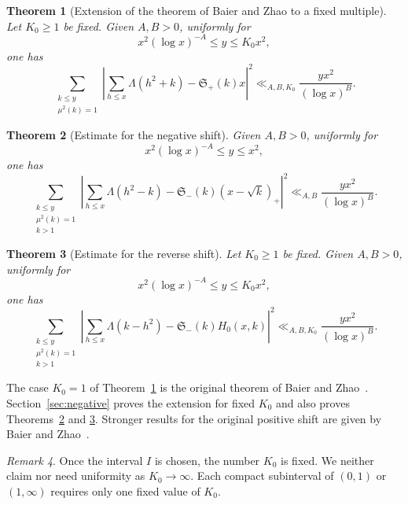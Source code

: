 \documentclass[12pt,reqno]{amsart}
\numberwithin{equation}{section}
\theoremstyle{plain}
\newtheorem{theorem}{Theorem}[section]
\theoremstyle{remark}
\newtheorem{remark}[theorem]{Remark}
\begin{document}
\begin{theorem}[Extension of the theorem of Baier and Zhao to a fixed multiple]
\label{thm:positive-main}
Let $K_0\geq1$ be fixed.  Given $A,B>0$, uniformly for
\[
 x^2(\log x)^{-A}\leq y\leq K_0x^2,
\]
one has
\begin{equation*}\label{positive-mean-square}
 \sum_{\substack{k\leq y\\ \mu^2(k)=1}}
 \left|
   \sum_{h\leq x}\Lambda(h^2+k)-\mathfrak S_+(k)x
 \right|^2
 \ll_{A,B,K_0}\frac{yx^2}{(\log x)^B}.
\end{equation*}
\end{theorem}

\begin{theorem}[Estimate for the negative shift]\label{thm:negative-main}
Given $A,B>0$, uniformly for
\[
 x^2(\log x)^{-A}\leq y\leq x^2,
\]
one has
\begin{equation*}\label{negative-mean-square}
 \sum_{\substack{k\leq y\\ \mu^2(k)=1\\k>1}}
 \left|
   \sum_{h\leq x}\Lambda(h^2-k)
   -\mathfrak S_-(k)(x-\sqrt{k})_+
 \right|^2
 \ll_{A,B}\frac{yx^2}{(\log x)^B}.
\end{equation*}
\end{theorem}

\begin{theorem}[Estimate for the reverse shift]\label{thm:reverse-main}
Let $K_0\geq1$ be fixed.
Given $A,B>0$, uniformly for
\[
 x^2(\log x)^{-A}\leq y\leq K_0x^2,
\]
one has
\begin{equation*}\label{reverse-mean-square}
 \sum_{\substack{k\leq y\\ \mu^2(k)=1\\k>1}}
 \left|
   \sum_{h\leq x}\Lambda(k-h^2)
   -\mathfrak S_-(k)H_0(x,k)
 \right|^2
 \ll_{A,B,K_0}\frac{yx^2}{(\log x)^B}.
\end{equation*}
\end{theorem}

The case $K_0=1$ of Theorem~\ref{thm:positive-main} is the original
theorem of Baier and Zhao~\cite[Theorem, p.~964]{BaierZhao2007}.
Section~\ref{sec:negative} proves the extension for fixed $K_0$ and
also proves Theorems~\ref{thm:negative-main} and
\ref{thm:reverse-main}.  Stronger results for the original positive
shift are given by Baier and Zhao~\cite{BaierZhao2009}.

\begin{remark}\label{rem:fixed-constant}
Once the interval $I$ is chosen, the number $K_0$ is fixed.  We neither
claim nor need uniformity as $K_0\to\infty$.  Each compact subinterval
of $(0,1)$ or $(1,\infty)$ requires only one fixed value of $K_0$.
\end{remark}
\end{document}
